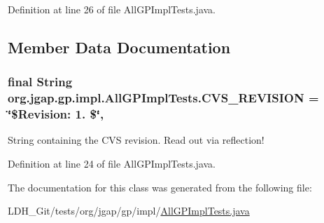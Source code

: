 Definition at line 26 of file All\-G\-P\-Impl\-Tests.\-java.



\subsection{Member Data Documentation}
\hypertarget{classorg_1_1jgap_1_1gp_1_1impl_1_1_all_g_p_impl_tests_a7db04feab6e072a67793c4938248a2ad}{
\subsubsection[{C\-V\-S\-\_\-\-R\-E\-V\-I\-S\-I\-O\-N}]{\setlength{\rightskip}{0pt plus 5cm}final String org.\-jgap.\-gp.\-impl.\-All\-G\-P\-Impl\-Tests.\-C\-V\-S\-\_\-\-R\-E\-V\-I\-S\-I\-O\-N = \char`\"{}\$Revision\-: 1. \$\char`\"{}\hspace{0.3cm}{\ttfamily [static]}, {\ttfamily [private]}}}\label{classorg_1_1jgap_1_1gp_1_1impl_1_1_all_g_p_impl_tests_a7db04feab6e072a67793c4938248a2ad}
String containing the C\-V\-S revision. Read out via reflection! 

Definition at line 24 of file All\-G\-P\-Impl\-Tests.\-java.



The documentation for this class was generated from the following file\-:\begin{DoxyCompactItemize}
\item 
L\-D\-H\-\_\-\-Git/tests/org/jgap/gp/impl/\hyperlink{_all_g_p_impl_tests_8java}{All\-G\-P\-Impl\-Tests.\-java}\end{DoxyCompactItemize}
